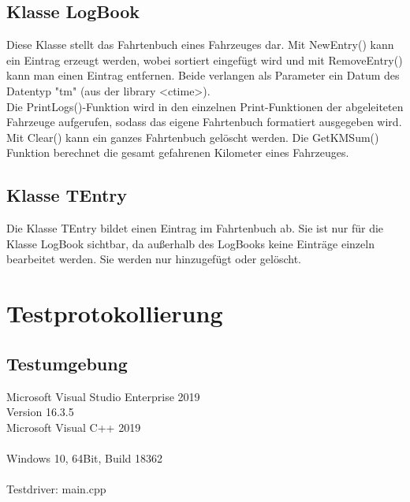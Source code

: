 \subsection{Klasse LogBook}
Diese Klasse stellt das Fahrtenbuch eines Fahrzeuges dar. Mit NewEntry() kann ein Eintrag erzeugt werden, wobei sortiert eingefügt wird und mit RemoveEntry() kann man einen Eintrag entfernen. Beide verlangen als Parameter ein Datum des Datentyp "tm" (aus der library \string<ctime\string>). \\
Die PrintLogs()-Funktion wird in den einzelnen Print-Funktionen der abgeleiteten Fahrzeuge aufgerufen, sodass das eigene Fahrtenbuch formatiert ausgegeben wird. \\
Mit Clear() kann ein ganzes Fahrtenbuch gelöscht werden. Die GetKMSum() Funktion berechnet die gesamt gefahrenen Kilometer eines Fahrzeuges.

\subsection{Klasse TEntry}
Die Klasse TEntry bildet einen Eintrag im Fahrtenbuch ab. Sie ist nur für die Klasse LogBook sichtbar, da außerhalb des LogBooks keine Einträge einzeln bearbeitet werden. Sie werden nur hinzugefügt oder gelöscht. 


\newpage
\section{Testprotokollierung}


\subsection{Testumgebung}

Microsoft Visual Studio Enterprise 2019\\
Version 16.3.5\\
Microsoft Visual C++ 2019\\
\\
Windows 10, 64Bit, Build 18362\\
\\
Testdriver: main.cpp

